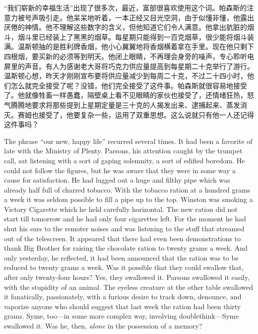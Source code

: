 \begin{paracol}{2}
\switchcolumn

``我们崭新的幸福生活''出现了很多次，最近，富部很喜欢使用这个词。帕森斯的注意力被号声吸引走。他呆呆地听着，一本正经又目光空洞，由于似懂非懂，他露出厌倦的神情。他不理解这些数字的含义，但他知道它们令人满意。他拿出肮脏的烟斗，烟斗里已经装上了黑黑的烟草。每星期只能得到一百克烟草，很少能将烟斗装满。温斯顿抽的是胜利牌香烟，他小心翼翼地将香烟横着拿在手里。现在他只剩下四根烟，要买新的必须等到明天。他闭上眼睛，不再理会身旁的噪声，专心聆听电屏里的声音。有人为感谢老大哥将巧克力供应量提高到每星期二十克举行了游行。温斯顿心想，昨天才刚刚宣布要将供应量减少到每周二十克，不过二十四小时，他们怎么就完全接受了呢？没错，他们完全接受了这件事。帕森斯就很容易地接受了。他就像牲畜一样愚蠢，隔壁桌上看不见眼睛的家伙也接受了，还情绪狂热，怒气腾腾地要求将那些提到上星期定量是三十克的人揭发出来、逮捕起来、蒸发消灭。赛姆也接受了，他要复杂一些，运用了双重思想。这么说就只有他一人还记得这件事吗？

\switchcolumn*

The phrase ``our new, happy life'' recurred several times. It had been a
favorite of late with the Ministry of Plenty. Parsons, his attention
caught by the trumpet call, sat listening with a sort of gaping
solemnity, a sort of edified boredom. He could not follow the figures,
but he was aware that they were in some way a cause for satisfaction. He
had lugged out a huge and filthy pipe which was already half full of
charred tobacco. With the tobacco ration at a hundred grams a week it
was seldom possible to fill a pipe up to the top. Winston was smoking a
Victory Cigarette which he held carefully horizontal. The new ration did
not start till tomorrow and he had only four cigarettes left. For the
moment he had shut his ears to the remoter noises and was listening to
the stuff that streamed out of the telescreen. It appeared that there
had even been demonstrations to thank Big Brother for raising the
chocolate ration to twenty grams a week. And only yesterday, he
reflected, it had been announced that the ration was to be reduced to
twenty grams a week. Was it possible that they could swallow that, after
only twenty-four hours? Yes, they swallowed it. Parsons swallowed it
easily, with the stupidity of an animal. The eyeless creature at the
other table swallowed it fanatically, passionately, with a furious
desire to track down, denounce, and vaporize anyone who should suggest
that last week the ration had been thirty grams. Syme, too---in some
more complex way, involving doublethink---Syme swallowed it. Was he,
then, \emph{alone} in the possession of a memory?


\end{paracol}
